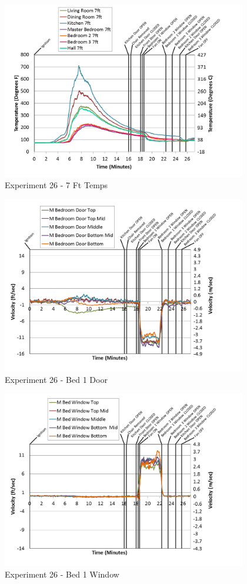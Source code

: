 \documentclass{article}
\begin{document}
\begin{appendices}
\begin{figure}[h!]
	\centering
	\includegraphics[height=3.05in]{0_Images/Results_Charts/Exp_26_Charts/7FtTemps.png}
	\caption{Experiment 26 - 7 Ft Temps}
\end{figure}

\clearpage

\begin{figure}[h!]
	\centering
	\includegraphics[height=3.05in]{0_Images/Results_Charts/Exp_26_Charts/Bed1Door.png}
	\caption{Experiment 26 - Bed 1 Door}
\end{figure}


\begin{figure}[h!]
	\centering
	\includegraphics[height=3.05in]{0_Images/Results_Charts/Exp_26_Charts/Bed1Window.png}
	\caption{Experiment 26 - Bed 1 Window}
\end{figure}


\end{appendices}
\end{document}
